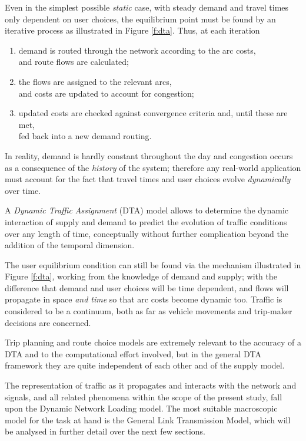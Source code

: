 Even in the simplest possible \emph{static} case, with steady demand and travel times only dependent on user choices, the equilibrium point must be found by an iterative process as illustrated in Figure \ref{f:dta}. Thus, at each iteration 
\begin{enumerate}
\item demand is routed through the network according to the arc costs, \\ and route flows are calculated;
\item the flows are assigned to the relevant arcs, \\ and costs are updated to account for congestion;
\item updated costs are checked against convergence criteria and, until these are met, \\ fed back into a new demand routing.
\end{enumerate} 


In reality, demand is hardly constant throughout the day and congestion occurs as a consequence of the \emph{history} of the system; therefore any real-world application must account for the fact that travel times and user choices evolve \emph{dynamically} over time.

A \emph{Dynamic Traffic Assignment} (DTA) model allows to determine the dynamic interaction of supply and demand to predict the evolution of traffic conditions over any length of time, conceptually without further complication beyond the addition of the temporal dimension.

The user equilibrium condition can still be found via the mechanism illustrated in Figure \ref{f:dta}, working from the knowledge of demand and supply; with the difference that demand and user choices will be time dependent, and flows will propagate in space \emph{and time} so that arc costs become dynamic too. Traffic is considered to be a continuum, both as far as vehicle movements and trip-maker decisions are concerned.

Trip planning and route choice models are extremely relevant to the accuracy of a DTA and to the computational effort involved, but in the general DTA framework they are quite independent of each other and of the supply model.

The representation of traffic as it propagates and interacts with the network and signals, and all related phenomena within the scope of the present study, fall upon the Dynamic Network Loading model.
The most suitable macroscopic model for the task at hand is the General Link Transmission Model, which will be analysed in further detail over the next few sections.

